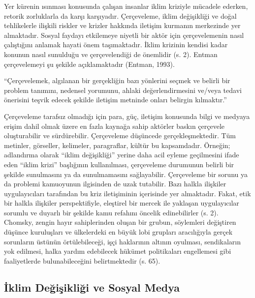 \documentclass[
]{book}
\begin{document}
Yer kürenin ısınması konusunda çalışan insanlar iklim kriziyle mücadele ederken, retorik zorluklarla da karşı karşıyadır. Çerçeveleme, iklim değişikliği ve doğal tehlikelerle ilişkili riskler ve krizler hakkında iletişim kurmanın merkezinde yer almaktadır. Sosyal faydayı etkilemeye niyetli bir aktör için çerçevelemenin nasıl çalıştığını anlamak hayati önem taşımaktadır. İklim krizinin kendisi kadar konunun nasıl sunulduğu ve çerçevelendiği de önemlidir (s. 2). \citep{drake2016communicating} Entman çerçevelemeyi şu şekilde açıklamaktadır (Entman, 1993). \citep{entman1993framing}

``Çerçevelemek, algılanan bir gerçekliğin bazı yönlerini seçmek ve belirli bir problem tanımını, nedensel yorumunu, ahlaki değerlendirmesini ve/veya tedavi önerisini teşvik edecek şekilde iletişim metninde onları belirgin kılmaktır.''

Çerçeveleme tarafsız olmadığı için para, güç, iletişim konusunda bilgi ve medyaya erişim dahil olmak üzere en fazla kaynağa sahip aktörler baskın çerçevele oluşturabilir ve sürdürebilir. Çerçeveleme düşüncede gerçekleşmektedir. Tüm metinler, görseller, kelimeler, paragraflar, kültür bu kapsamdadır. Örneğin; adlandırma olarak ``iklim değişikliği'' yerine daha acil eyleme geçilmesini ifade eden ``iklim krizi'' başlığının kullanılması, çerçeveleme durumunun belirli bir şekilde sunulmasını ya da sunulmamasını sağlayabilir. Çerçeveleme bir sorunu ya da problemi kamuoyunun ilgisinden de uzak tutabilir. Bazı halkla ilişkiler uygulayıcıları tarafından bu kriz iletişiminin içerisinde yer almaktadır. Fakat, etik bir halkla ilişkiler perspektifiyle, eleştirel bir mercek ile yaklaşan uygulayıcılar sorumlu ve duyarlı bir şekilde kamu refahını öncelik edinebilirler (s. 2). \citep{drake2016communicating}\\
Chomsky, zengin hayır sahiplerinden oluşan bir grubun, söylemleri değiştiren düşünce kuruluşları ve ülkelerdeki en büyük lobi grupları aracılığıyla gerçek sorunların üstünün örtülebileceği, işçi haklarının altının oyulması, sendikaların yok edilmesi, halka yardım edebilecek hükümet politikaları engellemesi gibi faaliyetlerde bulunabileceğini belirtmektedir (s. 65). \citep{chomsky2020}

\hypertarget{iklim-deux11fiux15fikliux11fi-ve-sosyal-medya}{%
\subsection{İklim Değişikliği ve Sosyal Medya}\label{iklim-deux11fiux15fikliux11fi-ve-sosyal-medya}}
\end{document}
